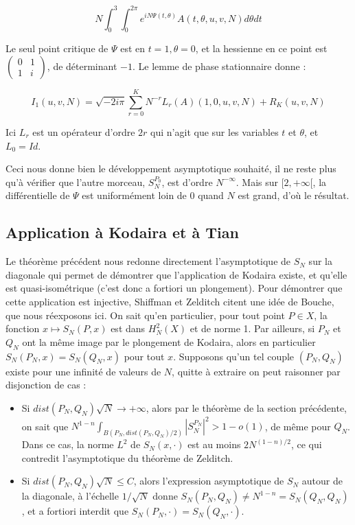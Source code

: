 \begin{preuve}
	\begin{equation*}
		N\int_0^3\int_0^{2\pi}e^{iN\Psi(t,\theta)}A(t,\theta, u,v,N)d\theta  dt
	\end{equation*}
	
	Le seul point critique de $\Psi$ est en $t=1, \theta=0$, et la hessienne en ce point est $\begin{pmatrix}
	0&1\\1&i
	\end{pmatrix}$, de déterminant $-1$. Le lemme de phase stationnaire donne :
	
	\begin{equation*}
	I_1(u,v,N) =\sqrt{-2i\pi}\sum_{r=0}^K N^{-r}L_r(A)(1,0,u,v,N) + R_K(u,v,N)
	\end{equation*}
	
	Ici $L_r$ est un opérateur d'ordre $2r$ qui n'agit que sur les variables $t$ et $\theta$, et $L_0=Id$. 
	
	Ceci nous donne bien le développement asymptotique souhaité, il ne reste plus qu'à vérifier que l'autre morceau, $S_N^{P_0}$, est d'ordre $N^{-\infty}$. Mais sur $[2,+\infty[$, la différentielle de $\Psi$ est uniformément loin de $0$ quand $N$ est grand, d'où le résultat.
	\end{preuve}
	
\subsection{Application à Kodaira et à Tian}
	Le théorème précédent nous redonne directement l'asymptotique de $S_N$ sur la diagonale qui permet de démontrer que l'application de Kodaira existe, et qu'elle est quasi-isométrique (c'est donc a fortiori un plongement). Pour démontrer que cette application est injective, Shiffman et Zelditch citent une idée de Bouche, que nous réexposons ici. On sait qu'en particulier, pour tout point $P \in X$, la fonction $x \mapsto S_N(P,x)$ est dans $H^2_N(X)$ et de norme 1. Par ailleurs, si $P_N$ et $Q_N$ ont la même image par le plongement de Kodaira, alors en particulier $S_N(P_N,x)=S_N(Q_N,x)$ pour tout $x$. Supposons qu'un tel couple $(P_N,Q_N)$ existe pour une infinité de valeurs de $N$, quitte à extraire on peut raisonner par disjonction de cas :
	
	\begin{itemize}
		\item Si $dist(P_N,Q_N)\sqrt{N} \to +\infty$, alors par le théorème de la section précédente, on sait que $N^{1-n}\int_{B(P_N,dist(P_N,Q_N)/2)}|S_N^{P_N}|^2 > 1-o(1)$, de même pour $Q_N$. Dans ce cas, la norme $L^2$ de $S_N(x,\cdot)$ est au moins $2N^{(1-n)/2}$, ce qui contredit l'asymptotique du théorème de Zelditch.
		\item Si $dist(P_N,Q_N)\sqrt{N} \leq C$, alors l'expression asymptotique de $S_N$ autour de la diagonale, à l'échelle $1/\sqrt{N}$ donne $S_N(P_N,Q_N)\neq N^{1-n}=S_N(Q_N,Q_N)$, et a fortiori interdit que $S_N(P_N,\cdot)=S_N(Q_N,\cdot)$.
	\end{itemize}

\chantier
